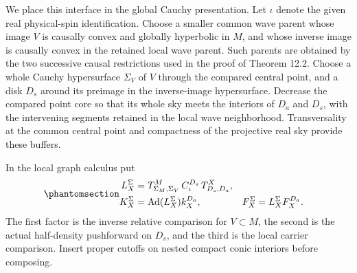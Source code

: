 \documentclass[
  english,
  11pt,
  reqno]{amsart}
\begin{document}
We place this interface in the global Cauchy presentation. Let \(\iota\)
denote the given real physical-spin identification. Choose a smaller
common wave parent whose image \(V\) is causally convex and globally
hyperbolic in \(M\), and whose inverse image is causally convex in the
retained local wave parent. Such parents are obtained by the two
successive causal restrictions used in the proof of Theorem 12.2. Choose
a whole Cauchy hypersurface \(\Sigma_V\) of \(V\) through the compared
central point, and a disk \(D_s\) around its preimage in the
inverse-image hypersurface. Decrease the compared point core so that its
whole sky meets the interiors of \(D_a\) and \(D_s\), with the
intervening segments retained in the local wave neighborhood.
Transversality at the common central point and compactness of the
projective real sky provide these buffers.

In the local graph calculus put
\begin{equation}\protect\phantomsection\label{eq:analytic-global-carrier-factorization}{
\begin{aligned}
L_X^\Sigma
 &=T^M_{\Sigma_M,\Sigma_V}\,
       C_\iota^{D_s}\,
       T^X_{D_s,D_a},\\
K_X^\Sigma
 &=\operatorname{Ad}(L_X^\Sigma)k_X^{D_a},
&F_X^\Sigma&=L_X^\Sigma F_X^{D_a}.
\end{aligned}
}\end{equation} The first factor is the inverse relative comparison for
\(V\subset M\), the second is the actual half-density pushforward on
\(D_s\), and the third is the local carrier comparison. Insert proper
cutoffs on nested compact conic interiors before composing.
\end{document}
